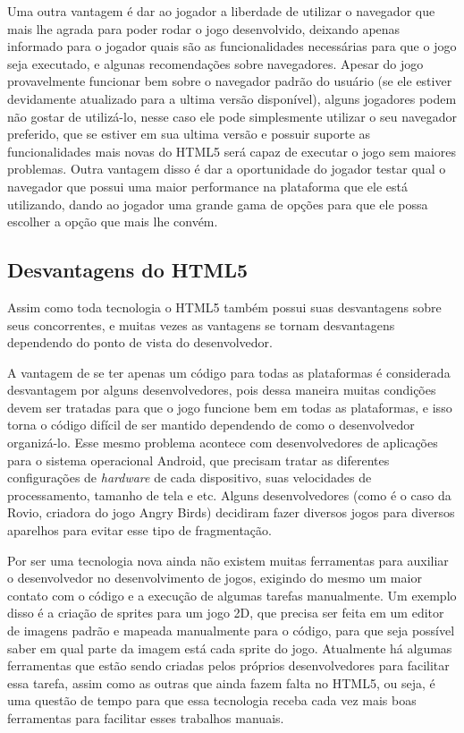 Uma outra vantagem é dar ao jogador a liberdade de utilizar o
navegador que mais lhe agrada para poder rodar o jogo desenvolvido,
deixando apenas informado para o jogador quais são as funcionalidades
necessárias para que o jogo seja executado, e algunas recomendações
sobre navegadores. Apesar do jogo provavelmente funcionar bem sobre o
navegador padrão do usuário (se ele estiver devidamente atualizado
para a ultima versão disponível), alguns jogadores podem não gostar de
utilizá-lo, nesse caso ele pode simplesmente utilizar
o seu navegador preferido, que se estiver em sua ultima
versão e possuir suporte as funcionalidades mais novas do HTML5 será
capaz de executar o jogo sem maiores problemas. Outra vantagem disso é
dar a oportunidade do jogador testar qual o navegador que possui uma
maior performance na plataforma que ele está utilizando, dando ao
jogador uma grande gama de opções para que ele possa escolher a opção
que mais lhe convém.

\subsection{Desvantagens do HTML5}
Assim como toda tecnologia o HTML5 também possui suas desvantagens
sobre seus concorrentes, e muitas vezes as vantagens se tornam
desvantagens dependendo do ponto de vista do desenvolvedor.

A vantagem de se ter apenas um código para todas as plataformas é
considerada desvantagem por alguns desenvolvedores, pois dessa maneira
muitas condições devem ser tratadas para que o jogo funcione bem em
todas as plataformas, e isso torna o código difícil de ser mantido
dependendo de como o desenvolvedor organizá-lo.
Esse mesmo problema acontece com desenvolvedores de aplicações para o
sistema operacional Android, que precisam tratar as diferentes
configurações de \textit{hardware} de cada dispositivo, suas
velocidades de processamento, tamanho de tela e etc. Alguns
desenvolvedores (como é o caso da Rovio, criadora do jogo Angry Birds)
decidiram fazer diversos jogos para diversos aparelhos para evitar
esse tipo de fragmentação.

Por ser uma tecnologia nova ainda não existem muitas ferramentas para
auxiliar o desenvolvedor no desenvolvimento de jogos, exigindo do
mesmo um maior contato com o código e a execução de algumas tarefas
manualmente. Um exemplo disso é a criação de sprites para um jogo 2D,
que precisa ser feita em um editor de imagens padrão e mapeada
manualmente para o código, para que seja possível saber em qual parte
da imagem está cada sprite do jogo.
Atualmente há algumas ferramentas que estão sendo criadas pelos
próprios desenvolvedores para facilitar essa tarefa, assim como as
outras que ainda fazem falta no HTML5, ou seja, é uma questão de tempo
para que essa tecnologia receba cada vez mais boas ferramentas para
facilitar esses trabalhos manuais.

